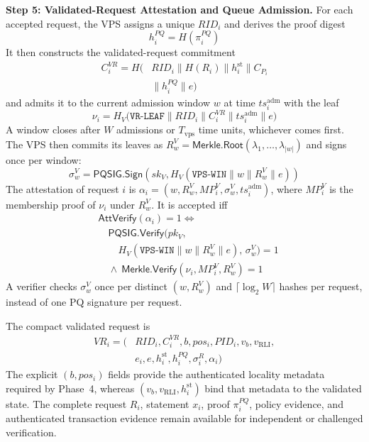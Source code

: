 \documentclass[lettersize,journal]{IEEEtran}
\begin{document}
\medskip
\noindent\textbf{Step 5: Validated-Request Attestation and Queue
Admission.}
For each accepted request, the VPS assigns a unique $RID_i$ and derives
the proof digest
\begin{equation}
h_i^{PQ}=H(\pi_i^{PQ})
\end{equation}
It then constructs the validated-request commitment
\begin{equation}
\begin{aligned}
C_i^{VR}
=
H\big(&RID_i\parallel H(R_i)
\parallel h_i^{\mathrm{st}}
\parallel C_{P_i}\\
&\parallel h_i^{PQ}
\parallel e\big)
\end{aligned}
\label{eq:cvr}
\end{equation}
and admits it to the current admission window $w$ at time
$ts_i^{\mathrm{adm}}$ with the leaf
\begin{equation}
\nu_i=
H_V\big(\texttt{VR-LEAF}\parallel RID_i\parallel C_i^{VR}
\parallel ts_i^{\mathrm{adm}}\parallel e\big)
\end{equation}
A window closes after $W$ admissions or $T_{\mathrm{vps}}$
time units, whichever comes first. The VPS then commits its leaves as
$R_w^{V}=\mathsf{Merkle.Root}(\lambda_1,\ldots,\lambda_{|w|})$ and
signs once per window:
\begin{equation}
\sigma_w^{V}=
\mathsf{PQSIG.Sign}
\left(
sk_V,
H_V(\texttt{VPS-WIN}\parallel w\parallel R_w^{V}\parallel e)
\right)
\end{equation}
The attestation of request $i$ is
$\alpha_i=(w,R_w^{V},MP_i^{V},\sigma_w^{V},ts_i^{\mathrm{adm}})$,
where $MP_i^{V}$ is the membership proof of $\nu_i$ under
$R_w^{V}$. It is accepted iff
\begin{equation}
\begin{aligned}
&\mathsf{AttVerify}(\alpha_i)=1 \iff\\
&\quad \mathsf{PQSIG.Verify}\big(pk_V,\\
&\qquad H_V(\texttt{VPS-WIN}\parallel w\parallel R_w^{V}\parallel e),\,
\sigma_w^{V}\big)=1\\
&\quad \land\ \mathsf{Merkle.Verify}(\nu_i,MP_i^{V},R_w^{V})=1
\end{aligned}
\label{eq:attverify}
\end{equation}
A verifier checks $\sigma_w^{V}$ once per distinct
$(w,R_w^{V})$ and $\lceil\log_2 W\rceil$ hashes per request, instead of
one PQ signature per request.

The compact validated request is
\begin{equation}
\begin{aligned}
VR_i=\big(&RID_i,C_i^{VR},b,pos_i,PID_i,
v_b,v_{\mathrm{RLI}},\\
&e_i,e,h_i^{\mathrm{st}},h_i^{PQ},
\sigma_i^R,\alpha_i\big)
\end{aligned}
\end{equation}
The explicit $(b,pos_i)$ fields provide the authenticated locality
metadata required by Phase~4, whereas
$(v_b,v_{\mathrm{RLI}},h_i^{\mathrm{st}})$ bind that metadata to the
validated state. The complete request $R_i$, statement $x_i$, proof
$\pi_i^{PQ}$, policy evidence, and authenticated transaction evidence
remain available for independent or challenged verification.
\end{document}

